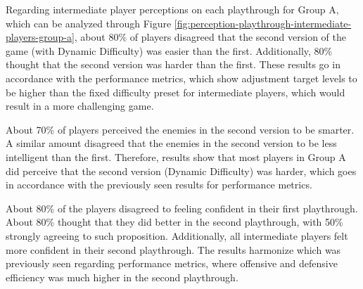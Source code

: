 Regarding intermediate player perceptions on each playthrough for Group A, which can be analyzed through Figure \ref{fig:perception-playthrough-intermediate-players-group-a}, about 80\% of players disagreed that the second version of the game (with Dynamic Difficulty) was easier than the first. Additionally, 80\% thought that the second version was harder than the first. These results go in accordance with the performance metrics, which show adjustment target levels to be higher than the fixed difficulty preset for intermediate players, which would result in a more challenging game.

About 70\% of players perceived the enemies in the second version to be smarter. A similar amount disagreed that the enemies in the second version to be less intelligent than the first. Therefore, results show that most players in Group A did perceive that the second version (Dynamic Difficulty) was harder, which goes in accordance with the previously seen results for performance metrics.

About 80\% of the players disagreed to feeling confident in their first playthrough. About 80\% thought that they did better in the second playthrough, with 50\% strongly agreeing to such proposition. Additionally, all intermediate players felt more confident in their second playthrough. The results harmonize which was previously seen regarding performance metrics, where offensive and defensive efficiency was much higher in the second playthrough.

